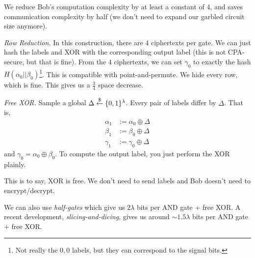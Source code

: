 
We reduce Bob's computation complexity by at least a constant of $4$, and saves communication complexity by half (we don't need to expand our garbled circuit size anymore).

\emph{Row Reduction.} In this construction, there are $4$ ciphertexts per gate. We can just hash the labels and \textsf{XOR} with the corresponding output label (this is not CPA-secure, but that is fine). From the $4$ ciphertexts, we can set $\gamma_0$ to exactly the hash $H(\alpha_0||\beta_0)$\footnote{Not really the $0,0$ labels, but they can correspond to the signal bits.}. This is compatible with point-and-permute. We hide every row, which is fine. This gives us a $\frac{3}{4}$ space decrease.

\emph{Free \textsf{XOR}.} Sample a global $\Delta\overset{\$}{\leftarrow}\{0,1\}^\lambda$. Every pair of labels differ by $\Delta$. That is,
\begin{align*}
    \alpha_1 & :=\alpha_0\oplus \Delta \\
    \beta_1  & :=\beta_0\oplus \Delta  \\
    \gamma_1 & :=\gamma_0\oplus \Delta
\end{align*}
and $\gamma_0 = \alpha_0\oplus \beta_0$. To compute the output label, you just perform the \textsf{XOR} plainly.

This is to say, \textsf{XOR} is free. We don't need to send labels and Bob doesn't need to encrypt/decrypt.

We can also use \emph{half-gates} which give us $2\lambda$ bits per \textsf{AND} gate + free \textsf{XOR}. A recent development, \emph{slicing-and-dicing}, gives us around $\sim 1.5\lambda$ bits per \textsf{AND} gate + free \textsf{XOR}.